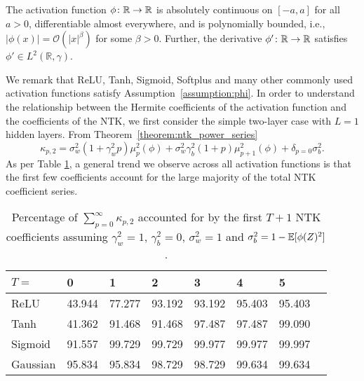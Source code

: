 \begin{assumption}\label{assumption:phi}
The activation function $\phi\colon\mathbb{R} \rightarrow \mathbb{R}$ is absolutely continuous on $[-a, a]$ for all $a > 0$, differentiable almost everywhere, and is polynomially bounded, i.e., $|\phi(x)| = \mathcal{O}(|x|^\beta)$ for some $\beta > 0$. 
Further, the derivative $\phi'\colon\mathbb{R} \rightarrow \mathbb{R}$ satisfies $\phi' \in L^2(\mathbb{R}, \gamma)$. 
\end{assumption}
We remark that ReLU, Tanh, Sigmoid, Softplus and many other commonly used activation functions satisfy Assumption~\ref{assumption:phi}. In order to understand the relationship between the Hermite coefficients of the activation function and the coefficients of the NTK, we first consider the simple two-layer case with $L=1$ hidden layers. From Theorem~\ref{theorem:ntk_power_series}
\begin{equation} \label{eq:ntk_coeffs_2_layer_simple}
    \kappa_{p,2} = \sigma_w^2(1 + \gamma_w^2 p)\mu_p^2(\phi) +\sigma_w^2 \gamma_b^2 (1+p)\mu_{p+1}^2(\phi)+ \delta_{p=0} \sigma_b^2.
\end{equation}
As per Table \ref{tab:kappa_2layer_coeffs}, a general trend we observe across all activation functions is that the first few coefficients account for the large majority of the total NTK coefficient series. 

\begin{table}[H]
\footnotesize 
\begin{center}
\caption{Percentage  of $\sum_{p=0}^{\infty}\kappa_{p,2}$ accounted for by the first $T+1$ NTK coefficients assuming $\gamma_w^2=1$, $\gamma_b^2 = 0$, $\sigma_w^2 = 1$ and $\sigma_b^2 = 1 - \mathbb{E}[\phi(Z)^2]$.}
\label{tab:kappa_2layer_coeffs}
\begin{tabular}{ |p{1.2cm}|p{1.2cm}|p{1.2cm}|p{1.2cm}|p{1.2cm}|p{1.2cm}|p{1.2cm}|p{1.2cm}| }
 \hline
 $T =$ & 0 & 1 & 2 & 3 & 4 & 5 \\
 \hline
ReLU & 43.944 & 77.277 & 93.192 & 93.192 & 95.403 & 95.403 \\
Tanh & 41.362 & 91.468 & 91.468 & 97.487 & 97.487 & 99.090 \\
Sigmoid & 91.557 & 99.729 & 99.729 & 99.977 & 99.977 & 99.997 \\
Gaussian & 95.834 & 95.834 & 98.729 & 98.729 & 99.634 & 99.634 \\
 \hline
\end{tabular}
\end{center}
\end{table}

